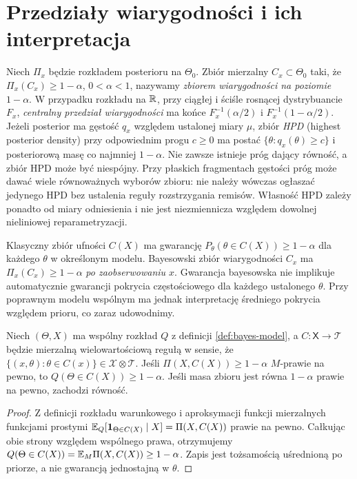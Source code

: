 \section{Przedziały wiarygodności i ich interpretacja}
\begin{definicja}
Niech $\Pi_x$ będzie rozkładem posterioru na $\Theta_0$.
Zbiór mierzalny $C_x\subset\Theta_0$ taki, że
$\Pi_x(C_x)\ge1-\alpha$, $0<\alpha<1$, nazywamy
\emph{zbiorem wiarygodności na poziomie $1-\alpha$}.
W przypadku rozkładu na $\mathbb R$, przy ciągłej i ściśle rosnącej
dystrybuancie $F_x$, \emph{centralny przedział wiarygodności}
ma końce $F_x^{-1}(\alpha/2)$ i $F_x^{-1}(1-\alpha/2)$.
Jeżeli posterior ma gęstość $q_x$ względem ustalonej miary $\mu$,
zbiór \emph{HPD} (highest posterior density) przy odpowiednim
progu $c\ge0$ ma postać $\{\theta:q_x(\theta)\ge c\}$
i posteriorową masę co najmniej $1-\alpha$. Nie zawsze istnieje
próg dający równość, a zbiór HPD może być niespójny.
Przy płaskich fragmentach gęstości próg może dawać wiele równoważnych
wyborów zbioru: nie należy wówczas ogłaszać jedynego HPD bez
ustalenia reguły rozstrzygania remisów. Własność HPD zależy ponadto
od miary odniesienia i nie jest niezmiennicza względem dowolnej
nieliniowej reparametryzacji.
\end{definicja}

\begin{uwaga}
Klasyczny zbiór ufności $C(X)$ ma gwarancję
$P_\theta(\theta\in C(X))\ge1-\alpha$ dla każdego $\theta$
w określonym modelu. Bayesowski zbiór wiarygodności $C_x$ ma
$\Pi_x(C_x)\ge1-\alpha$ \emph{po zaobserwowaniu $x$}.
Gwarancja bayesowska nie implikuje automatycznie gwarancji pokrycia
częstościowego dla każdego ustalonego $\theta$. Przy poprawnym
modelu wspólnym ma jednak interpretację średniego pokrycia
względem prioru, co zaraz udowodnimy.
\end{uwaga}

\begin{twierdzenie}
\label{thm:prior-coverage}
Niech $(\Theta,X)$ ma wspólny rozkład $Q$ z definicji
\ref{def:bayes-model}, a $C:\mathsf X\to\mathcal T$ będzie
mierzalną wielowartościową regułą w sensie, że
$\{(x,\theta):\theta\in C(x)\}\in\mathcal X\otimes\mathcal T$.
Jeśli $\Pi(X,C(X))\ge1-\alpha$ $M$-prawie na pewno,
to $Q(\Theta\in C(X))\ge1-\alpha$. Jeśli masa zbioru
jest równa $1-\alpha$ prawie na pewno, zachodzi równość.
\end{twierdzenie}
\begin{proof}
Z definicji rozkładu warunkowego i aproksymacji funkcji
mierzalnych funkcjami prostymi
$\mathbb E_Q[\mathbf 1_{\Theta\in C(X)}\mid X]=\Pi(X,C(X))$
prawie na pewno. Całkując obie strony względem wspólnego prawa,
otrzymujemy $Q(\Theta\in C(X))=\mathbb E_M\Pi(X,C(X))\ge1-\alpha$.
Zapis jest tożsamością uśrednioną po priorze, a nie gwarancją
jednostajną w $\theta$.
\end{proof}

